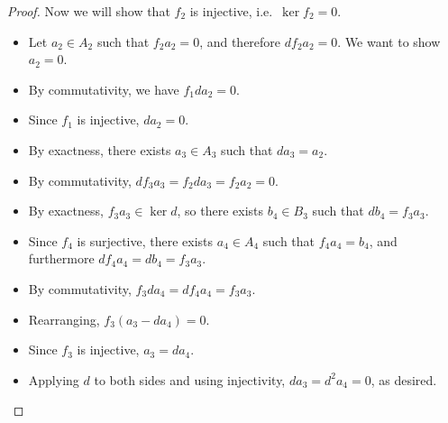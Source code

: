 \documentclass{standalone}
\begin{document}
\begin{proof}
  Now we will show that \(f_2\) is injective, i.e.\ \(\ker f_2 = 0\).
  \begin{itemize}[nosep]
    \item Let \(a_2 \in A_2\) such that \(f_2 a_2 = 0\), and therefore
    \(d f_2 a_2 = 0\). We want to show \(a_2 = 0\).
    \item By commutativity, we have \(f_1 d a_2 = 0\).
    \item Since \(f_1\) is injective, \(d a_2 = 0\).
    \item By exactness, there exists \(a_3 \in A_3\) such that \(d a_3 = a_2\).
    \item By commutativity, \(d f_3 a_3 = f_2 d a_3 = f_2 a_2 = 0\).
    \item By exactness, \(f_3 a_3 \in \ker d\), so there exists \(b_4 \in B_3\)
    such that \(d b_4 = f_3 a_3\).
    \item Since \(f_4\) is surjective, there exists \(a_4 \in A_4\) such that
    \(f_4 a_4 = b_4\), and furthermore \(d f_4 a_4 = d b_4 = f_3 a_3\).
    \item By commutativity, \(f_3 d a_4 = d f_4 a_4 = f_3 a_3\).
    \item Rearranging, \(f_3(a_3 - d a_4) = 0\).
    \item Since \(f_3\) is injective, \(a_3 = d a_4\).
    \item Applying \(d\) to both sides and using injectivity,
    \(d a_3 = d^2 a_4 = 0\), as desired. \pog
  \end{itemize}
\iffalse
  Let's show \(f_2\) is surjective. Pick \(b_2 \in B_2\). Note that
  \[
    d b_2 = f_1 a_1
  \]
  for some \(a_1\). Also note \(d a_1 = 0\) because
  \[
    f_0 d a_1 = d f_1 a_1 = d d b_2 = 0.
  \]
  By exactness, \(a_1 = d a_2\) for some \(a_2 \in A_2\).
  Note that \(d f_2 a_2 = f_1 d a_2 = f_1 a_1 = d b_2\).
  Consider \(b_2 - f_2 a\). This goes to \(0\) under \(d\).
  So we can find \(b_3 \in B_3\) such that \(d b_3 = b_2 - f_2 a_2\).
  Since \(f_3\) is an isomorphism, we can lift this to an \(a_3\) such that
  \(f_3 a_3 = b_3\) and now
  \[
    f_2 d a_3 = d f_3 a_3 = b_2 - f_2 a_2.
  \]
  Thus,
  \(b_2 = f_2(a_2 + d a_3)\).
\fi
\end{proof}
\end{document}
